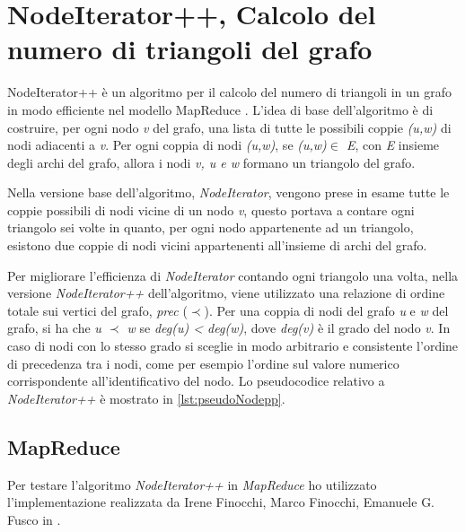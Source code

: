 \documentclass[LaM,binding=0.6cm]{sapthesis}
\begin{document}
\section{NodeIterator++, Calcolo del numero di triangoli del grafo}

NodeIterator++ \cite{Suri:2011:CTC:1963405.1963491} è un algoritmo per il calcolo del numero di triangoli in un grafo in modo efficiente nel modello MapReduce \cite{Dean:2008:MSD:1327452.1327492}.
L'idea di base dell'algoritmo è di costruire, per ogni nodo \textit{v} del grafo, una lista di tutte le possibili coppie \textit{(u,w)} di nodi adiacenti a \textit{v}. Per ogni coppia di nodi \textit{(u,w)}, se \textit{(u,w)$\in$ E}, con \textit{E} insieme degli archi del grafo, allora i nodi \textit{ v, u e w } formano un triangolo del grafo.
 
Nella versione base dell'algoritmo, \textit{NodeIterator}, vengono prese in esame tutte le coppie possibili di nodi vicine di un nodo \textit{v}, questo portava a contare ogni triangolo sei volte in quanto, per ogni nodo appartenente ad un triangolo, esistono due coppie di nodi vicini appartenenti all'insieme di archi del grafo.

Per migliorare l'efficienza di \textit{NodeIterator} contando ogni triangolo una volta, nella versione \textit{NodeIterator++} dell'algoritmo, viene utilizzato una relazione di ordine totale sui vertici del grafo, \textit{prec} ($\prec$). Per una coppia di nodi del grafo \textit{u} e \textit{w} del grafo, si ha che \textit{u $\prec$ w} se \textit{deg(u) < deg(w)}, dove \textit{deg(v)} è il grado del nodo \textit{v}. In caso di nodi con lo stesso grado si sceglie in modo arbitrario e consistente l'ordine di precedenza tra i nodi, come per esempio l'ordine sul valore numerico corrispondente all'identificativo del nodo. Lo pseudocodice  relativo a \textit{NodeIterator++} è mostrato in \ref{lst:pseudoNodepp}.

\begin{minipage}{\linewidth}
	
\end{minipage}


\subsection{MapReduce}

Per testare l'algoritmo \textit{NodeIterator++} in \textit{MapReduce} ho utilizzato l'implementazione realizzata da Irene Finocchi, Marco Finocchi, Emanuele G. Fusco in \cite{DBLP:journals/corr/FinocchiFF14}.
\end{document}
